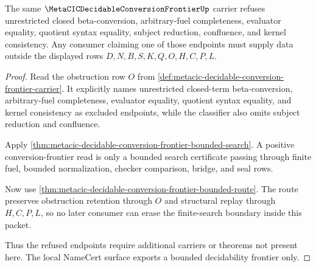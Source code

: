 \begin{theorem}
\label{thm:metacic-decidable-conversion-frontier-refusal}
The same $\MetaCICDecidableConversionFrontierUp$ carrier refuses unrestricted closed beta-conversion, arbitrary-fuel completeness, evaluator equality, quotient syntax equality, subject reduction, confluence, and kernel consistency. Any consumer claiming one of those endpoints must supply data outside the displayed rows $D,N,B,S,K,Q,O,H,C,P,L$.
\end{theorem}
\begin{proof}
Read the obstruction row $O$ from \autoref{def:metacic-decidable-conversion-frontier-carrier}. It explicitly names unrestricted closed-term beta-conversion, arbitrary-fuel completeness, evaluator equality, quotient syntax equality, and kernel consistency as excluded endpoints, while the classifier also omits subject reduction and confluence.

Apply \autoref{thm:metacic-decidable-conversion-frontier-bounded-search}. A positive conversion-frontier read is only a bounded search certificate passing through finite fuel, bounded normalization, checker comparison, bridge, and seal rows.

Now use \autoref{thm:metacic-decidable-conversion-frontier-bounded-route}. The route preserves obstruction retention through $O$ and structural replay through $H,C,P,L$, so no later consumer can erase the finite-search boundary inside this packet.

Thus the refused endpoints require additional carriers or theorems not present here. The local NameCert surface exports a bounded decidability frontier only.
\end{proof}


